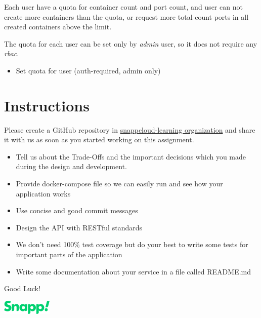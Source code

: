 \documentclass{article}
\begin{document}
Each user have a quota for container count and port count, and user can not create more containers than the quota, or request more total count ports in all created containers above the limit.

The quota for each user can be set only by \textit{admin} user, so it does not require any \textit{rbac}.

\begin{itemize}
  \item Set quota for user (auth-required, admin only)
\end{itemize}

\section{Instructions}

Please create a GitHub repository in \href{https://github.com/orgs/snappcloud-learning/repositories}{snappcloud-learning organization} and share it
with us as soon as you started working on this assignment.

\begin{itemize}
  \item Tell us about the Trade-Offs and the important decisions which you made during the design and development.
  \item Provide docker-compose file so we can easily run and see how your application works
  \item Use concise and good commit messages
  \item Design the API with RESTful standards
  \item We don’t need 100\% test coverage but do your best to write some tests for important parts of the application
  \item Write some documentation about your service in a file called README.md
\end{itemize}

Good Luck!

\vspace{1cm}
\includegraphics[width=.25\textwidth]{./snapp.png}
\end{document}
